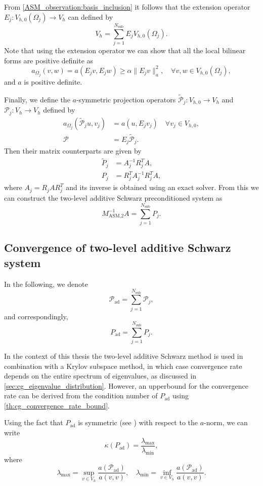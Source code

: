 From \cref{ASM_observation:basis_inclusion} it follows that the extension operator $E_j: V_{h,0}(\Omega_j) \rightarrow V_h$ can defined by
\[
  V_h = \sum_{j=1}^{N_{\text{sub}}} E_j V_{h,0}(\Omega_j).
\]
Note that using the extension operator we can show that all the local bilinear forms are positive definite as
\[
  a_{\Omega_j}(v,w) = a(E_j v, E_j w) \geq \alpha \| E_j v \|_a^2, \quad \forall v,w\in V_{h,0}(\Omega_j),
\]
and $a$ is positive definite.

Finally, we define the $a$-symmetric projection operators $\tilde{\mathcal{P}}_j: V_{h,0} \rightarrow V_h$ and $\mathcal{P}_j:V_h \rightarrow V_h$ defined by
\begin{align*}
  a_{\Omega_j}(\tilde{\mathcal{P}}_j u, v_j) & = a(u, E_j v_j) \quad \forall v_j \in V_{h,0}, \\
  \mathcal{P}                                & = E_j \tilde{\mathcal{P}}_j.
\end{align*}
Then their matrix counterparts are given by
\begin{align*}
  \tilde{P}_j & =  A_j^{-1} R_j^T A,      \\
  P_j         & = R_j^T A_j^{-1} R_j^T A,
\end{align*}
where $A_j = R_j A R_j^T$ and its inverse is obtained using an exact solver. From this we can construct the two-level additive Schwarz preconditioned system as
\begin{equation}
  M_{\text{ASM,2}}^{-1} A = \sum_{j=1}^{N_{\text{sub}}} P_j.
  \label{eq:two_level_ASM_projections}
\end{equation}

\subsection{Convergence of two-level additive Schwarz system}\label{sec:two_level_ASM_convergence}
In the following, we denote
\[
  \mathcal{P}_{\text{ad}} = \sum_{j=1}^{N_{\text{sub}}} \mathcal{P}_j,
\]
and correspondingly,
\[
  P_{\text{ad}} = \sum_{j=1}^{N_{\text{sub}}} P_j.
\]

In the context of this thesis the two-level additive Schwarz method is used in combination with a Krylov subspace method, in which case convergence rate depends on the entire spectrum of eigenvalues, as discussed in \cref{sec:cg_eigenvalue_distribution}. However, an upperbound for the convergence rate can be derived from the condition number of $P_{\text{ad}}$ using \cref{th:cg_convergence_rate_bound}.

Using the fact that $P_{\text{ad}}$ is symmetric (see \cite[Lemma 5.8]{schwarz_methods_Dolean_2015}) with respect to the $a$-norm, we can write
\[
  \kappa(P_{\text{ad}}) = \frac{\lambda_{\text{max}}}{\lambda_{\text{min}}},
\]
where
\[
  \lambda_{\text{max}} = \sup_{v\in V_h} \frac{a(\mathcal{P}_{\text{ad}})}{a(v,v)}, \quad \lambda_{\text{min}} = \inf_{v\in V_h} \frac{a(\mathcal{P}_{\text{ad}})}{a(v,v)}.
\]

